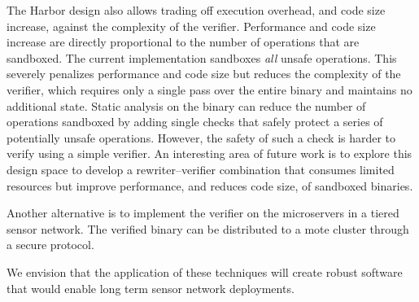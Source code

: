The Harbor design also allows trading off execution overhead, and code size
increase, against the complexity of the verifier.
%
Performance and code size increase are directly proportional to the
number of operations that are sandboxed.
%
The current implementation sandboxes \textit{all} unsafe operations.
%
This severely penalizes performance and code size but reduces the
complexity of the verifier, which requires only a single pass over the
entire binary and maintains no additional state.
%
Static analysis on the binary can reduce the number of operations
sandboxed by adding single checks that safely protect a series of
potentially unsafe operations.
%
However, the safety of such a check is harder to verify using a simple
verifier.
%
%
An interesting area of future work is to explore this design space to
develop a rewriter--verifier combination that consumes limited
resources but improve performance, and reduces code size, of sandboxed
binaries.


%
%
%
Another alternative is to implement the verifier on the microservers 
in a tiered sensor network.
%
The verified binary can be distributed to a mote cluster through a
secure protocol.
%

%
%
%
%
We envision that the application of these techniques will create
robust software that would enable long term sensor network
deployments.

